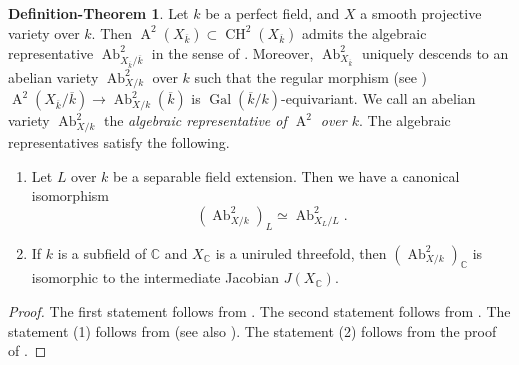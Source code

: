 \documentclass[autodetect-engine, a4paper]{amsart}
\theoremstyle{definition}
\newtheorem{defn-thm}[thm]{Definition-Theorem}
\def\C{{\mathbb C}}
\DeclareMathOperator\CH{\mathrm{CH}}
\DeclareMathOperator\A{\mathrm{A}}
\DeclareMathOperator\Ab{\mathrm{Ab}}
\DeclareMathOperator\Gal{\mathrm{Gal}}
\begin{document}
\begin{defn-thm}
\label{defn-thm:representative}
Let $k$ be a perfect field, and $X$ a smooth projective variety over $k$. 
Then $\A^2(X_{\overline{k}}) \subset \CH^2(X_{\overline{k}})$ admits the algebraic representative $\Ab^2_{X_{\overline{k}}/\overline{k}}$ in the sense of \cite[Definition 1.6.1]{Murre}.
Moreover, $\Ab^2_{X_{\overline{k}}}$ uniquely descends to an abelian variety $\Ab^2_{X/k}$ over $k$ such that the regular morphism (see \cite[Definition 1.6.1]{Murre}) $\A^2(X_{\overline{k}}/\overline{k}) \rightarrow \Ab^2_{X/k} (\overline{k})$ is $\Gal (\overline{k}/k)$-equivariant. We call an abelian variety $\Ab^2_{X/k}$ the \emph{algebraic representative of $\A^2$ over $k$}.
The algebraic representatives satisfy the following.
\begin{enumerate}
\item 
 Let $L$ over $k$ be a separable field extension.
 Then we have a canonical isomorphism
 \[
 (\Ab^2_{X/k})_L \simeq \Ab^2_{X_{L}/L}.
 \]

\item
 If $k$ is a subfield of $\C$ and $X_{\C}$ is a uniruled threefold, then $(\Ab^2_{X/k})_{\C}$ is isomorphic to the intermediate Jacobian $J(X_{\C})$.
 \end{enumerate}
\end{defn-thm}

\begin{proof}
The first statement follows from \cite[Theorem A]{Murre}.
The second statement follows from \cite[Theorem 4.4]{ACMV1}.
The statement (1) follows from \cite[Theorem 1]{ACMVfunctorial} (see also \cite[Remark 1.1 and Remark 1.2]{ACMVdecomposition}).
The statement (2) follows from the proof of \cite[Theorem 5.1 and Corollary 5.2]{ACMV1}.
\end{proof}
\end{document}
